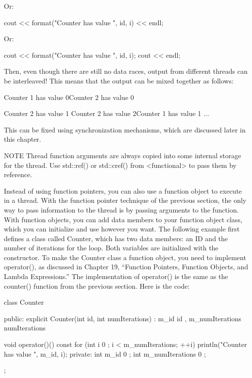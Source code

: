 Or:

\begin{cpp}
cout << format("Counter {} has value {}", id, i) << endl;
\end{cpp}

Or:

\begin{cpp}
cout << format("Counter {} has value {}", id, i);
cout << endl;
\end{cpp}

Then, even though there are still no data races, output from different threads can be interleaved! This means that the output can be mixed together as follows:

\begin{shell}
Counter 1 has value 0Counter 2 has value 0

Counter 2 has value 1
Counter 2 has value 2Counter 1 has value 1
...
\end{shell}

This can be fixed using synchronization mechanisms, which are discussed later in this chapter.

\begin{myNotic}{NOTE}
Thread function arguments are always copied into some internal storage for the thread. Use std::ref() or std::cref() from <functional> to pass them by reference.
\end{myNotic}


Instead of using function pointers, you can also use a function object to execute in a thread. With the function pointer technique of the previous section, the only way to pass information to the thread is by passing arguments to the function. With function objects, you can add data members to your function object class, which you can initialize and use however you want. The following example first defines a class called Counter, which has two data members: an ID and the number of iterations for the loop. Both variables are initialized with the constructor. To make the Counter class a function object, you need to implement operator(), as discussed in Chapter 19, “Function Pointers, Function Objects, and Lambda Expressions.” The implementation of operator() is the same as the counter() function from the previous section. Here is the code:

\begin{cpp}
class Counter
{
    public:
        explicit Counter(int id, int numIterations)
            : m_id { id }, m_numIterations { numIterations } { }

        void operator()() const
        {
            for (int i { 0 }; i < m_numIterations; ++i) {
                println("Counter {} has value {}", m_id, i);
            }
        }
    private:
        int m_id { 0 };
        int m_numIterations { 0 };
};
\end{cpp}

